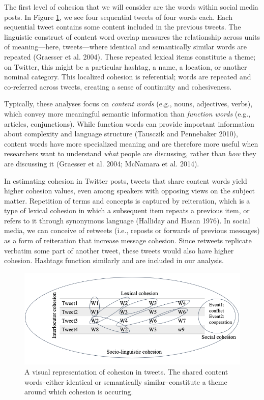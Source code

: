 \documentclass[
  english,
  man]{apa6}
\begin{document}
The first level of cohesion that we will consider are the words within social
media posts. In Figure \ref{fig:cohesion-in-tweets}, we see four sequential
tweets of four words each. Each sequential tweet contains some content
included in the previous tweets. The linguistic construct of content word
overlap measures the relationship across units of meaning---here, tweets---where
identical and semantically similar words are repeated (Graesser et al. 2004). These
repeated lexical items constitute a theme; on Twitter, this might be a
particular hashtag, a name, a location, or another nominal category. This
localized cohesion is referential; words are repeated and co-referred across
tweets, creating a sense of continuity and cohesiveness.

Typically, these analyses focus on \emph{content words} (e.g., nouns, adjectives,
verbs), which convey more meaningful semantic information than \emph{function words}
(e.g., articles, conjunctions). While function words can provide important
information about complexity and language structure
(Tausczik and Pennebaker 2010), content words have more specialized meaning and
are therefore more useful when researchers want to understand \emph{what} people are
discussing, rather than \emph{how} they are discussing it (Graesser et al. 2004; McNamara et al. 2014).

In estimating cohesion in Twitter posts, tweets that share content words
yield higher cohesion values, even among speakers with opposing
views on the subject matter. Repetition of terms and concepts is captured by
reiteration, which is a type of lexical cohesion in which a subsequent item
repeats a previous item, or refers to it through synonymous language
(Halliday and Hasan 1976). In social media, we can conceive of retweets (i.e., reposts
or forwards of previous messages) as a form of reiteration
that increase message cohesion. Since retweets replicate verbatim some part of
another tweet, these tweets would also have higher cohesion. Hashtags function
similarly and are included in our analysis.

\begin{figure}
\includegraphics[width=1\linewidth]{./figs/cohesion-in-tweets} \caption{A visual representation of cohesion in tweets. The shared content words--either identical or semantically similar--constitute a theme around which cohesion is occuring.}\label{fig:cohesion-in-tweets}
\end{figure}
\end{document}
